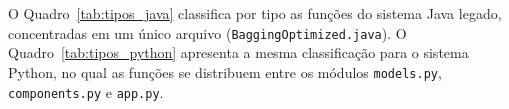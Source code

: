 
O Quadro~\ref{tab:tipos_java} classifica por tipo as funções do sistema Java legado, concentradas em um único arquivo (\texttt{BaggingOptimized.java}). O Quadro~\ref{tab:tipos_python} apresenta a mesma classificação para o sistema Python, no qual as funções se distribuem entre os módulos \texttt{models.py}, \texttt{components.py} e \texttt{app.py}.

